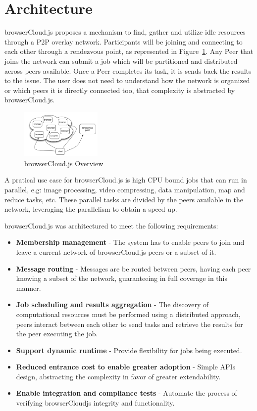 
\section{Architecture}

browserCloud.js proposes a mechanism to find, gather and utilize idle resources through a P2P overlay network. Participants will be joining and connecting to each other through a rendezvous point, as represented in Figure~\ref{fig:b-e}. Any Peer that joins the network can submit a job which will be partitioned and distributed across peers available. Once a Peer completes its task, it is sends back the results to the issue. The user does not need to understand how the network is organized or which peers it is directly connected too, that complexity is abstracted by browserCloud.js.

\begin{figure}[h!]
  \centering
  \includegraphics[width=0.35\textwidth]{figs/birds-eye}
  \caption{browserCloud.js Overview}
  \label{fig:b-e}
\end{figure}

A pratical use case for browserCloud.js is high CPU bound jobs that can run in parallel, e.g: image processing, video compressing, data manipulation, map and reduce tasks, etc. These parallel tasks are divided by the peers available in the network, leveraging the parallelism to obtain a speed up.

browserCloud.js was architectured to meet the following requirements:

\begin{itemize}
    \item \textbf{Membership management} - The system has to enable peers to join and leave a current network of browserCloud.js peers or a subset of it.
    \item \textbf{Message routing} - Messages are be routed between peers, having each peer knowing a subset of the network, guaranteeing in full coverage in this manner.
    \item \textbf{Job scheduling and results aggregation} - The discovery of computational resources must be performed using a distributed approach, peers interact between each other to send tasks and retrieve the results for the peer executing the job.
    \item \textbf{Support dynamic runtime} - Provide flexibility for jobs being executed. 
    \item \textbf{Reduced entrance cost to enable greater adoption} - Simple APIs design, abstracting the complexity in favor of greater extendability.
    \item \textbf{Enable integration and compliance tests} - Automate the process of verifying browserCloudjs integrity and functionality.
\end{itemize}

